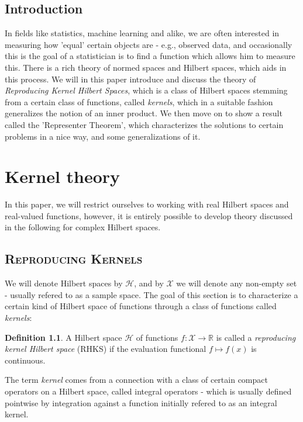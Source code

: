 \documentclass[10pt,twoside,openany,final]{memoir}
\newcommand{\sssection}[1]{%
\section[#1]{\centering\normalfont\scshape \textbf{#1}}}
\theoremstyle{definition}
\newtheorem{definition}[theorem]{Definition}
\theoremstyle{Break}
\newcommand{\R}{\mathbb{R}}
\renewcommand{\H}{\mathcal{H}}
\begin{document}

\newpage

\begin{KeepFromToc}
\chapter*{Introduction}
In fields like statistics, machine learning and alike, we are often interested in measuring how 'equal' certain objects are - e.g., observed data, and occasionally this is the goal of a statistician is to find a function which allows him to measure this. There is a rich theory of normed spaces and Hilbert spaces, which aids in this process. We will in this paper introduce and discuss the theory of \emph{Reproducing Kernel Hilbert Spaces}, which is a class of Hilbert spaces stemming from a certain class of functions, called \emph{kernels}, which in a suitable fashion generalizes the notion of an inner product. We then move on to show a result called the 'Representer Theorem', which characterizes the solutions to certain problems in a nice way, and some generalizations of it.
	  \tableofcontents
\end{KeepFromToc}


\chapter{Kernel theory}
In this paper, we will restrict ourselves to working with real Hilbert spaces and real-valued functions, however, it is entirely possible to develop theory discussed in the following for complex Hilbert spaces. 

\sssection{Reproducing Kernels}
We will denote Hilbert spaces by $\H$, and by $\mathcal{X}$ we will denote any non-empty set - usually refered to as a sample space. The goal of this section is to characterize a certain kind of Hilbert space of functions through a class of functions called \emph{kernels}:
\begin{definition}
	A Hilbert space $\H$ of functions $f \colon \mathcal{X} \to \R$ is called a \emph{reproducing kernel Hilbert space} (RHKS) if the evaluation functional $f \mapsto f(x)$ is continuous.
\end{definition}
The term \textit{kernel} comes from a connection with a class of certain compact operators on a Hilbert space, called integral operators - which is usually defined pointwise by integration against a function initially refered to as an integral kernel. 
\end{document}
